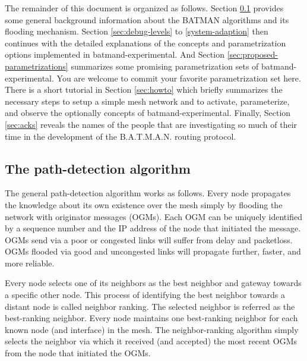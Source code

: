 \documentclass[11pt]{article}
\begin{document}
The remainder of this document is organized as follows.
%
Section \ref{sec:algorithm} provides some general background information about the BATMAN algorithms and its flooding mechanism. 
%
Section \ref{sec:debug-levels} to \ref{system-adaption} then continues with the detailed explanations of the concepts and parametrization options implemented in batmand-experimental.
%
And Section \ref{sec:proposed-parametrizations} summarizes some promising parametrization sets of batmand-experimental. You are welcome to commit your favorite parametrization set here.
%
There is a short tutorial in Section \ref{sec:howto} which briefly summarizes the necessary steps to setup a simple mesh network and to activate, parameterize, and observe the optionally concepts of batmand-experimental. 
%
Finally, Section \ref{sec:acks} reveals the names of the people that are investigating so much of their time in the development of the B.A.T.M.A.N. routing protocol.




\subsection{The path-detection algorithm}
\label{sec:algorithm}
The general path-detection algorithm works as follows.
Every node propagates the knowledge about its own existence over the mesh simply by flooding the network with originator messages (OGMs).
%
Each OGM can be uniquely identified by a sequence number and the IP address of the node that initiated the message.
%
OGMs send via a poor or congested links will suffer from delay and packetloss.
OGMs flooded via good and uncongested links will propagate further, faster, and more reliable.


%
Every node selects one of its neighbors as the best neighbor and gateway towards a specific other node.
%
This process of identifying the best neighbor towards a distant node is called neighbor ranking. 
%
The selected neighbor is referred as the best-ranking neighbor. 
%
Every node maintains one best-ranking neighbor for each known node (and interface) in the mesh.
%
The neighbor-ranking algorithm simply selects the neighbor via which it received (and accepted) the most recent OGMs from the node that initiated the OGMs.
%
\end{document}
